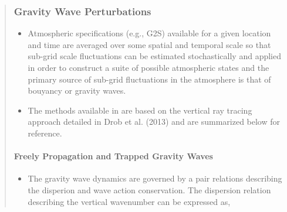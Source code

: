 \documentclass[letterpaper,10pt,english]{sphinxmanual}
\begin{document}
\begin{itemize}
\begin{quote}
\begin{sphinxVerbatim}[commandchars=\\\{\}]
   
    \PYG{p}{[}\PYG{p}{]}\PYG{p}{[}\PYG{p}{]}  
    \PYG{p}{[}\PYG{p}{]}\PYG{p}{[}\PYG{p}{]}    \PYG{p}{[}\PYG{p}{]}\PYG{p}{[}\PYG{p}{]}  

        
\end{sphinxVerbatim}


\subsubsection{Gravity Wave Perturbations}
\label{\detokenize{gravity:gravity-wave-perturbations}}\label{\detokenize{gravity:gravity}}\label{\detokenize{gravity::doc}}\begin{itemize}
\item {} 
Atmospheric specifications (e.g., G2S) available for a given location and time are averaged over some spatial and temporal scale so that sub-grid scale fluctuations can be estimated stochastically and applied in order to construct a suite of possible atmospheric states and the primary source of sub-grid fluctuations in the atmosphere is that of bouyancy or gravity waves.

\item {} 
The methods available in  are based on the vertical ray tracing approach detailed in Drob et al. (2013) and are summarized below for reference.

\end{itemize}


\paragraph{Freely Propagation and Trapped Gravity Waves}
\label{\detokenize{gravity:freely-propagation-and-trapped-gravity-waves}}\begin{itemize}
\item {} 
The gravity wave dynamics are governed by a pair relations describing the disperion and wave action conservation.  The dispersion relation describing the vertical wavenumber can be expressed as,


\end{itemize}
\end{quote}
\end{itemize}
\end{document}
